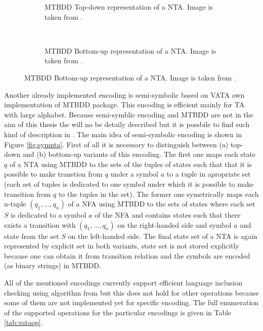 \begingroup
{}%
\begin{figure}[bt]
\label{fig:symnta}
	\centering
	\begin{subfigure}{.5\textwidth}
		\centering
		
		\caption{MTBDD Top-down representation of a NTA. Image is taken from \cite{tacas12}.}
		\label{fig:mtbdd_td}
	\end{subfigure}%
	~
	\begin{subfigure}{.5\textwidth}
	\centering
	
	\caption{MTBDD Bottom-up representation of a NTA. Image is taken from \cite{tacas12}.}
	\label{fig:mtbdd_bu}
	\end{subfigure}%
\end{figure}
\endgroup

Another already implemented encoding is semi-symbolic based on VATA own implementation of MTBDD package.
This encoding is efficient mainly for TA with large alphabet.
Because semi-symblic encoding and MTBDD are not in the aim of this thesis the will no be detaily described
but it is possbile to find such kind of description in \cite{lengal10}.
The main idea of semi-symbolic encoding is shown in Figure \ref{fig:symnta}.
First of all it is necessary to distinguish between (a) top-down and (b) bottom-up variants of this encoding.
The first one maps each state $q$ of a NTA using MTBDD to the sets of the tuples of states such that that it is possible
to make transtion from $q$ under a symbol $a$ to a tuple in apropriate set (each set of tuples is dedicated
to one symbol under which it is possible to make transition from $q$ to the tuples in the set).
The former one symetrically maps each n-tuple $(q_1,\ldots,q_n)$ of a NFA using MTBDD to the sets of states
where each set $S$ is dedicated to a symbol $a$ of the NFA and contains states such that there exists a transition
with $(q_1,\ldots,q_n)$ on the right-handed side and symbol $a$ and state from the set $S$ on the left-handed side.
The final state set of a NTA is again represented by explicit set in both variants,
state set is not stored explicitly because one can obtain it from transition relation and
the symbols are encoded (as binary strings) in MTBDD.

All of the mentioned encodings currently support efficient language inclusion checking using algorithm
from \cite{tacas10} but this does not hold for other operations because some of them are not implemented yet for specific encoding.
The full enumeration of the supported operations for the particular encodings is given in Table \ref{tab:vataop}.

